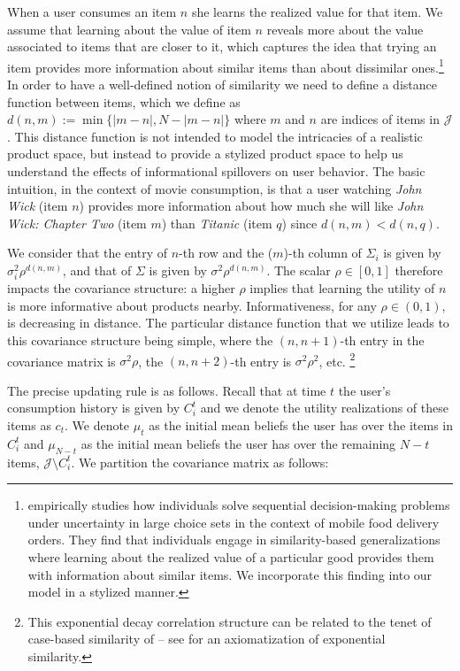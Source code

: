 \documentclass[format=acmsmall, review=false]{acmart}
\newcommand{\xhdr}[1]{\vspace{1mm} \noindent{\bf #1}}
\begin{document}
\xhdr{User Learning}
When a user consumes an item $n$ she learns the realized value for that item. We assume that learning about the value of item $n$ reveals more about the value associated to items that are closer to it, which captures the idea that trying an item provides more information about similar items than about dissimilar ones.\footnote{\cite{schulz2019structured} empirically studies how individuals solve sequential decision-making problems under uncertainty in large choice sets in the context of mobile food delivery orders. They find that individuals engage in similarity-based generalizations where learning about the realized value of a particular good provides them with information about similar items. We incorporate this finding into our model in a stylized manner.} In order to have a well-defined notion of similarity we need to define a distance function between items, which we define as $d(n,m):=\min\{ \lvert m - n \rvert ,N - \lvert m - n \rvert \}$ where $m$ and $n$ are indices of items in $\mathcal{J}$. This distance function is not intended to model the intricacies of a realistic product space, but instead to provide a stylized product space to help us understand the effects of informational spillovers on user behavior. The basic intuition, in the context of movie consumption, is that a user watching \textit{John Wick} (item $n$) provides more information about how much she will like \textit{John Wick: Chapter Two} (item $m$) than \textit{Titanic} (item $q$) since $d(n, m) < d(n, q)$. 
\par
We consider that the entry of $n$-th row and the ($m$)-th column of $\Sigma_i$ is given by $\sigma_i^2 \rho^{d(n,m)}$, and that of $\Sigma$ is given by $\sigma^2 \rho^{d(n,m)}$. The scalar $\rho \in [0,1]$ therefore impacts the covariance structure: a higher $\rho$ implies that learning the utility of $n$ is more informative about products nearby. Informativeness, for any $\rho \in (0,1)$, is decreasing in distance. The particular distance function that we utilize leads to this covariance structure being simple, where the $(n,n+1)$-th entry in the covariance matrix is $\sigma^{2} \rho$, the $(n,n+2)$-th entry is $\sigma^{2} \rho^2$, etc. \footnote{This exponential decay correlation structure can be related to the tenet of case-based similarity of \cite{gilboa1995case} -- see \cite{billot2008axiomatization} for an axiomatization of exponential similarity.}
\par
The precise updating rule is as follows. Recall that at time $t$ the user's consumption history is given by $C_{i}^{t}$ and we denote the utility realizations of these items as $c_t$. We denote $\mu_t$ as the initial mean beliefs the user has over the items in $C_{i}^{t}$ and $\mu_{N-t}$ as the initial mean beliefs the user has over the remaining $N-t$ items, $\mathcal{J} \setminus C_{i}^{t}$. We partition the covariance matrix as follows:
\end{document}
